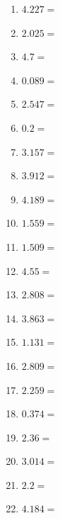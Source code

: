 \documentclass[12pt]{article}
\begin{document}
\begin{enumerate}
\newpage
\item \large $ 4.227 = $ \vspace{1.5cm}
\item \large $ 2.025 = $ \vspace{1.5cm}
\item \large $ 4.7 = $ \vspace{1.5cm}
\item \large $ 0.089 = $ \vspace{1.5cm}
\item \large $ 2.547 = $ \vspace{1.5cm}
\item \large $ 0.2 = $ \vspace{1.5cm}
\item \large $ 3.157 = $ \vspace{1.5cm}
\item \large $ 3.912 = $ \vspace{1.5cm}
\item \large $ 4.189 = $ \vspace{1.5cm}
\item \large $ 1.559 = $ \vspace{1.5cm}
\newpage
\item \large $ 1.509 = $ \vspace{1.5cm}
\item \large $ 4.55 = $ \vspace{1.5cm}
\item \large $ 2.808 = $ \vspace{1.5cm}
\item \large $ 3.863 = $ \vspace{1.5cm}
\item \large $ 1.131 = $ \vspace{1.5cm}
\item \large $ 2.809 = $ \vspace{1.5cm}
\item \large $ 2.259 = $ \vspace{1.5cm}
\item \large $ 0.374 = $ \vspace{1.5cm}
\item \large $ 2.36 = $ \vspace{1.5cm}
\item \large $ 3.014 = $ \vspace{1.5cm}
\newpage
\item \large $ 2.2 = $ \vspace{1.5cm}
\item \large $ 4.184 = $ \vspace{1.5cm}

\end{enumerate}
\end{document}
